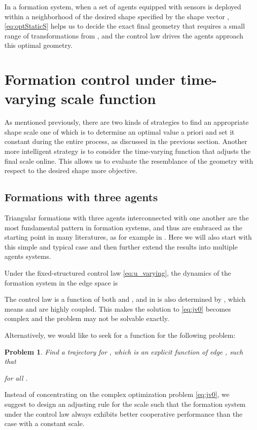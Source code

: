 \documentclass[times]{rncauth}
\newtheorem{prob}{Problem}[section]
\begin{document}
In a formation system, when a set of agents equipped with sensors is
deployed within a neighborhood of the desired shape specified by the
shape vector , \eqref{eq:optStaticS} helps us to decide the
exact final geometry that requires a small range of transformations
from , and the control law drives the agents approach this
optimal geometry.

\section{Formation control under time-varying scale
function}\label{sec:varying}
As mentioned previously, there are two kinds of strategies to find
an appropriate shape scale one of which  is to determine an optimal
value a priori and set it constant during the entire process, as
discussed in the previous section. Another more intelligent strategy
is to consider the time-varying function  that adjusts
the final scale online. This allows us to evaluate the resemblance of the geometry with respect to the desired shape more objective.



\subsection{Formations with three agents}
 Triangular
formations with three agents interconnected with one another are the
most fundamental pattern in formation systems, and thus are
embraced as the starting point in many literatures, as for example
in
\cite{Yu09minimalPersistent,Huang10optimalFormation,Anderson08UAV}.
Here we will also start with this simple and typical case and then
further extend the results into multiple  agents systems.

Under the fixed-structured control law  \eqref{eq:u_varying}, the
dynamics of the formation system in the edge space is

The control law  is a function of both 
and , and  in  is
also determined by , which means  and 
are highly coupled. This makes the solution to \eqref{eq:jv0}
becomes complex and the problem may not be solvable  exactly.

Alternatively, we would like to seek for a function
 for the following problem:
\begin{prob}\label{prob:threeOptimal}
Find a trajectory for , which is an
explicit function of edge , such that

for all .
\end{prob}
Instead of concentrating on the complex optimization problem
\eqref{eq:jv0}, we suggest to design an  adjusting rule for the scale such that the formation system under the control law always exhibits better
cooperative performance than the case with a constant scale.
\end{document}
